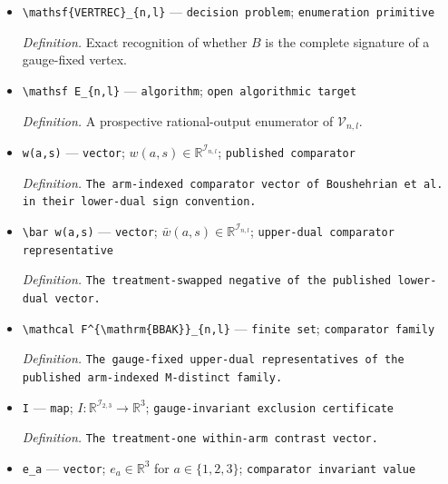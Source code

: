 \documentclass{article}
\begin{document}
\begin{itemize}
  \par\smallskip\noindent\emph{Definition.} \(r=2nl-l+1\).
  \item \texttt{\textbackslash{}\allowbreak{}mathsf\{VERTREC\}\allowbreak{}\_\allowbreak{}\{n,\allowbreak{}l\}\allowbreak{}} --- \texttt{decision problem}; \texttt{enumeration primitive}
  \par\smallskip\noindent\emph{Definition.} Exact recognition of whether \(B\) is the complete signature of a gauge-fixed vertex.
  \item \texttt{\textbackslash{}\allowbreak{}mathsf E\_\allowbreak{}\{n,\allowbreak{}l\}\allowbreak{}} --- \texttt{algorithm}; \texttt{open algorithmic target}
  \par\smallskip\noindent\emph{Definition.} A prospective rational-output enumerator of \(\mathcal V_{n,l}\).
  \item \texttt{w(a,\allowbreak{}s)} --- \texttt{vector}; \(w(a,s)\in\mathbb R^{\mathcal I_{n,l}}\); \texttt{published comparator}
  \par\smallskip\noindent\emph{Definition.} \texttt{The arm-\allowbreak{}indexed comparator vector of Boushehrian et al. in their lower-\allowbreak{}dual sign convention.}
  \item \texttt{\textbackslash{}\allowbreak{}bar w(a,\allowbreak{}s)} --- \texttt{vector}; \(\bar w(a,s)\in\mathbb R^{\mathcal I_{n,l}}\); \texttt{upper-\allowbreak{}dual comparator representative}
  \par\smallskip\noindent\emph{Definition.} \texttt{The treatment-\allowbreak{}swapped negative of the published lower-\allowbreak{}dual vector.}
  \item \texttt{\textbackslash{}\allowbreak{}mathcal F\textasciicircum{}\{\textbackslash{}\allowbreak{}mathrm\{BBAK\}\allowbreak{}\}\allowbreak{}\_\allowbreak{}\{n,\allowbreak{}l\}\allowbreak{}} --- \texttt{finite set}; \texttt{comparator family}
  \par\smallskip\noindent\emph{Definition.} \texttt{The gauge-\allowbreak{}fixed upper-\allowbreak{}dual representatives of the published arm-\allowbreak{}indexed M-\allowbreak{}distinct family.}
  \item \texttt{I} --- \texttt{map}; \(I:\mathbb R^{\mathcal I_{2,3}}\to\mathbb R^3\); \texttt{gauge-\allowbreak{}invariant exclusion certificate}
  \par\smallskip\noindent\emph{Definition.} \texttt{The treatment-\allowbreak{}one within-\allowbreak{}arm contrast vector.}
  \item \texttt{e\_\allowbreak{}a} --- \texttt{vector}; \(e_a\in\mathbb R^3\) for \(a\in\{1,2,3\}\); \texttt{comparator invariant value}

\end{itemize}
\end{document}
